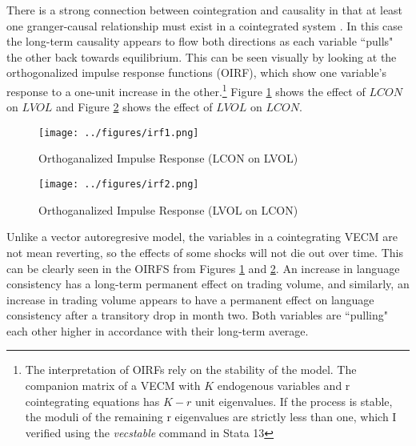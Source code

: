 There is a strong connection between cointegration and causality in that at least one granger-causal relationship must exist in a cointegrated system \citep{engle1987}. In this case the long-term causality appears to flow both directions as each variable ``pulls" the other back towards equilibrium. This can be seen visually by looking at the orthogonalized impulse response functions (OIRF), which show one variable's response to a one-unit increase in the other.\footnote{The interpretation of OIRFs rely on the stability of the model. The companion matrix of a VECM with $K$ endogenous variables and r cointegrating equations has $K - r$ unit eigenvalues. If the process is stable, the moduli of the remaining r eigenvalues are strictly less than one, which I verified using the \emph{vecstable} command in Stata 13} Figure \ref{irf1} shows the effect of $LCON$ on $LVOL$ and Figure \ref{irf2} shows the effect of $LVOL$ on $LCON$. 

\begin{figure}
\begin{center}
\texttt{[image: ../figures/irf1.png]}
\caption[Orthoganalized Impulse Response (LCON on LVOL)]{Orthoganalized Impulse Response (LCON on LVOL)\label{irf1}}
\end{center}
\end{figure}

\begin{figure}
\begin{center}
\texttt{[image: ../figures/irf2.png]}
\caption[Orthoganalized Impulse Response (LVOL on LCON)]{Orthoganalized Impulse Response (LVOL on LCON)\label{irf2}}
\end{center}
\end{figure}

Unlike a vector autoregresive model, the variables in a cointegrating VECM are not mean reverting, so the effects of some shocks will not die out over time. This can be clearly seen in the OIRFS from Figures \ref{irf1} and \ref{irf2}. An increase in language consistency has a long-term permanent effect on trading volume, and similarly, an increase in trading volume appears to have a permanent effect on language consistency after a transitory drop in month two. Both variables are ``pulling" each other higher in accordance with their long-term average.

